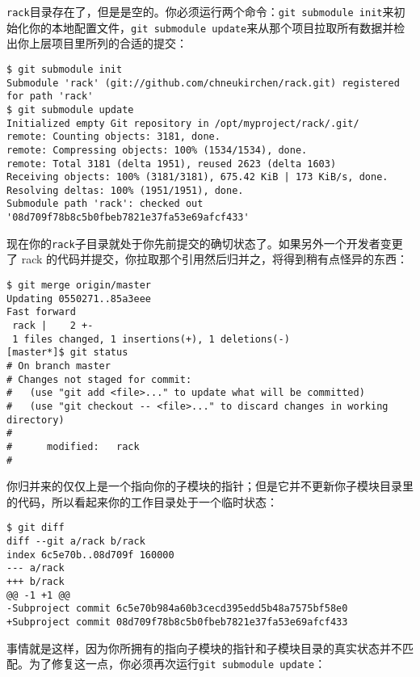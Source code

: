 \documentclass[a4paper]{book}
\begin{document}
\texttt{rack}目录存在了，但是是空的。你必须运行两个命令：\texttt{git submodule init}来初始化你的本地配置文件，\texttt{git submodule update}来从那个项目拉取所有数据并检出你上层项目里所列的合适的提交：

\begin{shaded}\begin{verbatim}
$ git submodule init
Submodule 'rack' (git://github.com/chneukirchen/rack.git) registered for path 'rack'
$ git submodule update
Initialized empty Git repository in /opt/myproject/rack/.git/
remote: Counting objects: 3181, done.
remote: Compressing objects: 100% (1534/1534), done.
remote: Total 3181 (delta 1951), reused 2623 (delta 1603)
Receiving objects: 100% (3181/3181), 675.42 KiB | 173 KiB/s, done.
Resolving deltas: 100% (1951/1951), done.
Submodule path 'rack': checked out '08d709f78b8c5b0fbeb7821e37fa53e69afcf433'
\end{verbatim}\end{shaded}

现在你的\texttt{rack}子目录就处于你先前提交的确切状态了。如果另外一个开发者变更了 rack 的代码并提交，你拉取那个引用然后归并之，将得到稍有点怪异的东西：

\begin{shaded}\begin{verbatim}
$ git merge origin/master
Updating 0550271..85a3eee
Fast forward
 rack |    2 +-
 1 files changed, 1 insertions(+), 1 deletions(-)
[master*]$ git status
# On branch master
# Changes not staged for commit:
#   (use "git add <file>..." to update what will be committed)
#   (use "git checkout -- <file>..." to discard changes in working directory)
#
#      modified:   rack
#
\end{verbatim}\end{shaded}

你归并来的仅仅上是一个指向你的子模块的指针；但是它并不更新你子模块目录里的代码，所以看起来你的工作目录处于一个临时状态：

\begin{shaded}\begin{verbatim}
$ git diff
diff --git a/rack b/rack
index 6c5e70b..08d709f 160000
--- a/rack
+++ b/rack
@@ -1 +1 @@
-Subproject commit 6c5e70b984a60b3cecd395edd5b48a7575bf58e0
+Subproject commit 08d709f78b8c5b0fbeb7821e37fa53e69afcf433
\end{verbatim}\end{shaded}

事情就是这样，因为你所拥有的指向子模块的指针和子模块目录的真实状态并不匹配。为了修复这一点，你必须再次运行\texttt{git submodule update}：
\end{document}
